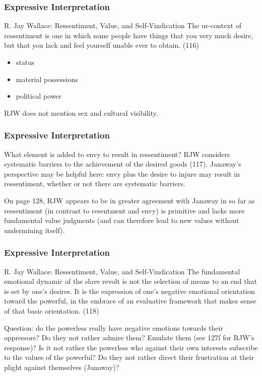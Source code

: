 \documentclass[xcolor=dvipsnames]{beamer}
\begin{document}
\begin{frame}
  \frametitle{Expressive Interpretation}
  \begin{block}{R. Jay Wallace: Ressentiment, Value, and
      Self-Vindication}
    The ur-context of ressentiment is one in which some people have
    things that you very much desire, but that you lack and feel
    yourself unable ever to obtain. (116)
  \end{block}
  \begin{itemize}
  \item status
  \item material possessions
  \item political power
  \end{itemize}
  RJW does not mention sex and cultural visibility. 
\end{frame}

\begin{frame}
  \frametitle{Expressive Interpretation}
  What element is added to envy to result in ressentiment? RJW
  considers systematic barriers to the achievement of the desired
  goods (117). Janaway's perspective may be helpful here: envy plus
  the desire to injure may result in ressentiment, whether or not
  there are systematic barriers.

  \bigskip

  On page 128, RJW appears to be in greater agreement with Janaway in
  so far as ressentiment (in contrast to resentment and envy) is
  primitive and lacks more fundamental value judgments (and can
  therefore lead to new values without undermining itself).
\end{frame}

\begin{frame}
  \frametitle{Expressive Interpretation}
  \begin{block}{R. Jay Wallace: Ressentiment, Value, and
      Self-Vindication}
    The fundamental emotional dynamic of the slave revolt is not the
    selection of means to an end that is set by one's desires. It is
    the expression of one's negative emotional orientation toward the
    powerful, in the embrace of an evaluative framework that makes
    sense of that basic orientation. (118)
  \end{block}
  Question: do the powerless really have negative emotions towards
  their oppressors? Do they not rather admire them? Emulate them (see
  127f for RJW's response)? Is it not rather the powerless who against
  their own interests subscribe to the values of the powerful? Do they
  not rather direct their frustration at their plight against
  themselves (Janaway)?
\end{frame}
\end{document}
